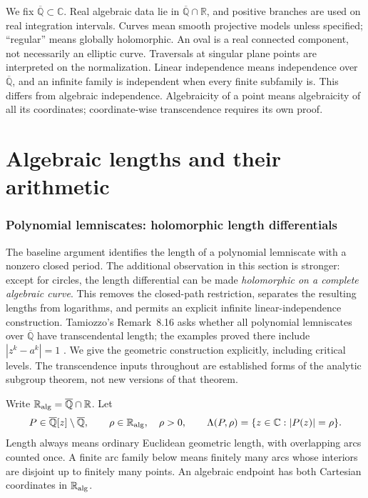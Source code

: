 \documentclass[11pt,a4paper]{article}
\theoremstyle{definition}
\theoremstyle{remark}
\numberwithin{equation}{section}
\newcommand{\Qbar}{\overline{\mathbb Q}}
\begin{document}
We fix $\Qbar\subset\mathbb C$. Real algebraic data lie in
$\Qbar\cap\mathbb R$, and positive branches are used on real integration
intervals. Curves mean smooth projective models unless specified;
``regular'' means globally holomorphic. An oval is a real connected
component, not necessarily an elliptic curve. Traversals at singular
plane points are interpreted on the normalization. Linear independence
means independence over $\Qbar$, and an infinite family is independent
when every finite subfamily is. This differs from algebraic independence.
Algebraicity of a point means algebraicity of all its coordinates;
coordinate-wise transcendence requires its own proof.

\clearpage
\begingroup\small\setlength{\parskip}{0pt}\tableofcontents\endgroup
\clearpage

\part{Algebraic lengths and their arithmetic}

\section{Polynomial lemniscates: holomorphic length differentials}
\label{lm-section}

The baseline argument identifies the length of a polynomial lemniscate with
a nonzero closed period.  The additional observation in this section is
stronger: except for circles, the length differential can be made
\emph{holomorphic on a complete algebraic curve}.  This removes the
closed-path restriction, separates the resulting lengths from logarithms,
and permits an explicit infinite linear-independence construction.
Tamiozzo's Remark~8.16 asks whether all polynomial lemniscates over
$\Qbar$ have transcendental length; the examples proved there include
$|z^k-a^k|=1$ \cite{lm-Tamiozzo}.  We give the geometric construction
explicitly, including critical levels.  The transcendence inputs throughout
are established forms of the analytic subgroup theorem, not new versions of
that theorem.

Write $\mathbb R_{\rm alg}=\Qbar\cap\mathbb R$.  Let
\begin{equation}\label{lm-level}
 P\in\Qbar[z]\setminus\Qbar,\qquad
 \rho\in\mathbb R_{\rm alg},\quad \rho>0,\qquad
 \Lambda(P,\rho)=\{z\in\mathbb C:|P(z)|=\rho\}.
\end{equation}
Length always means ordinary Euclidean geometric length, with overlapping
arcs counted once.  A finite arc family below means finitely many arcs
whose interiors are disjoint up to finitely many points.  An algebraic
endpoint has both Cartesian coordinates in $\mathbb R_{\rm alg}$.
\end{document}
